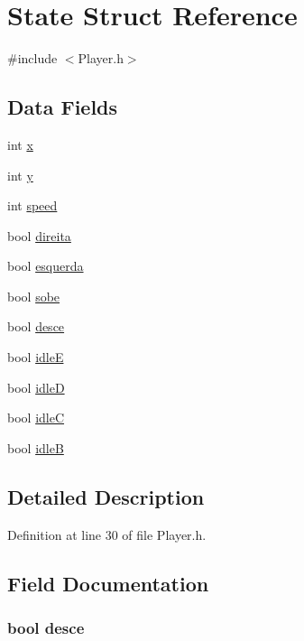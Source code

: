 \hypertarget{struct_state}{\section{State Struct Reference}
\label{struct_state}
}


{\ttfamily \#include $<$Player.\-h$>$}

\subsection*{Data Fields}
\begin{DoxyCompactItemize}
\item 
int \hyperlink{struct_state_a6150e0515f7202e2fb518f7206ed97dc}{x}
\item 
int \hyperlink{struct_state_a0a2f84ed7838f07779ae24c5a9086d33}{y}
\item 
int \hyperlink{struct_state_a218b4f7c6cc2681a99c23a3b089d68b1}{speed}
\item 
bool \hyperlink{struct_state_a53d4a67dd6be122bb796d09f318b6ce7}{direita}
\item 
bool \hyperlink{struct_state_a28653e1423da75a038905c2790b190cc}{esquerda}
\item 
bool \hyperlink{struct_state_a5f444f9fb63ff35f1199d30e371fca9c}{sobe}
\item 
bool \hyperlink{struct_state_ab30c1edc7fbe52981eb7abf22e56a1c5}{desce}
\item 
bool \hyperlink{struct_state_a77820c4afecbfbb8d401a746086f7f9f}{idle\-E}
\item 
bool \hyperlink{struct_state_a6e5746683faab531c01dfef6305bc44c}{idle\-D}
\item 
bool \hyperlink{struct_state_a8ac061efd18c70b659f400162c88b57d}{idle\-C}
\item 
bool \hyperlink{struct_state_a378d1ba542bfcaf5e3a389d49aeef4f3}{idle\-B}
\end{DoxyCompactItemize}


\subsection{Detailed Description}


Definition at line 30 of file Player.\-h.



\subsection{Field Documentation}
\hypertarget{struct_state_ab30c1edc7fbe52981eb7abf22e56a1c5}{
\subsubsection[{desce}]{\setlength{\rightskip}{0pt plus 5cm}bool desce}}\label{struct_state_ab30c1edc7fbe52981eb7abf22e56a1c5}


